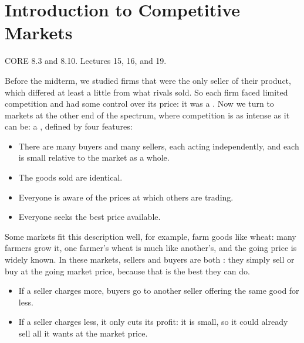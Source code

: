 \documentclass[11pt]{article}
\newcommand{\secinfo}[1]{{\small\color{muted}#1\par}\vspace{2pt}}
\begin{document}


\setcounter{tocdepth}{2}
\hypertarget{contents}{}
\tableofcontents

\newpage
\section{Introduction to Competitive Markets}
\secinfo{CORE 8.3 and 8.10. Lectures 15, 16, and 19.}

Before the midterm, we studied firms that were the only seller of their product, which differed at least a little from what rivals sold. So each firm faced limited competition and had some control over its price: it was a . Now we turn to markets at the other end of the spectrum, where competition is as intense as it can be: a , defined by four features:
\begin{itemize}
\item[(i)] There are many buyers and many sellers, each acting independently, and each is small relative to the market as a whole.
\item[(ii)] The goods sold are identical.
\item[(iii)] Everyone is aware of the prices at which others are trading.
\item[(iv)] Everyone seeks the best price available.
\end{itemize}

Some markets fit this description well, for example, farm goods like wheat: many farmers grow it, one farmer's wheat is much like another's, and the going price is widely known. In these markets, sellers and buyers are both : they simply sell or buy at the going market price, because that is the best they can do.

\begin{itemize}
\item If a seller charges more, buyers go to another seller offering the same good for less.
\item If a seller charges less, it only cuts its profit: it is small, so it could already sell all it wants at the market price.
\end{itemize}
\end{document}
